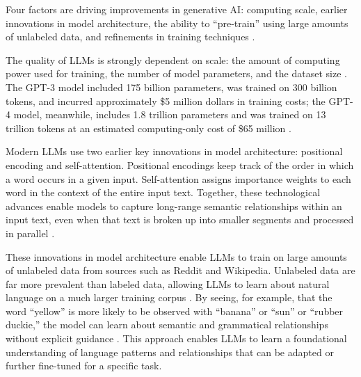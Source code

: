 \documentclass[11pt]{article}
\begin{document}
Four factors are driving improvements in generative AI: computing scale, earlier innovations in model architecture, the ability to ``pre-train'' using large amounts of unlabeled data, and refinements in training techniques \citep{radfordImprovingLanguageUnderstanding2018, radfordLanguageModelsAre2019,  ouyangTrainingLanguageModels2022, liuSummaryChatGPTGPT42023}.

The quality of LLMs is strongly dependent on scale: the amount of computing power used for training, the number of model parameters, and the dataset size \citep{kaplan2020scaling}.  The GPT-3 model included 175 billion parameters, was trained on 300 billion tokens, and incurred approximately \$5 million dollars in training costs; the GPT-4 model, meanwhile, includes 1.8 trillion parameters and was trained on 13 trillion tokens at an estimated computing-only cost of \$65 million \citep{liOpenAIGPT3Language2020, brownLanguageModelsAre2020, gpt4scale}.

Modern LLMs use two earlier key innovations in model architecture: positional encoding and self-attention. Positional encodings keep track of the order in which a word occurs in a given input. Self-attention assigns importance weights to each word in the context of the entire input text. Together, these technological advances enable models to capture long-range semantic relationships within an input text, even when that text is broken up into smaller segments and processed in parallel \citep{bahdanau2016neural, vaswaniAttentionAllYou2017}.

These innovations in model architecture enable LLMs to train on large amounts of unlabeled data from sources such as Reddit and Wikipedia. Unlabeled data are far more prevalent than labeled data, allowing LLMs to learn about natural language on a much larger training corpus \citep{brownLanguageModelsAre2020}.  By seeing, for example, that the word ``yellow'' is more likely to be observed with ``banana'' or ``sun'' or ``rubber duckie,'' the model can learn about semantic and grammatical relationships without explicit guidance \citep{radfordImprovingLanguageUnderstanding2018}.  This approach enables LLMs to learn a foundational understanding of language patterns and relationships that can be adapted or further fine-tuned for a specific task.
\end{document}

